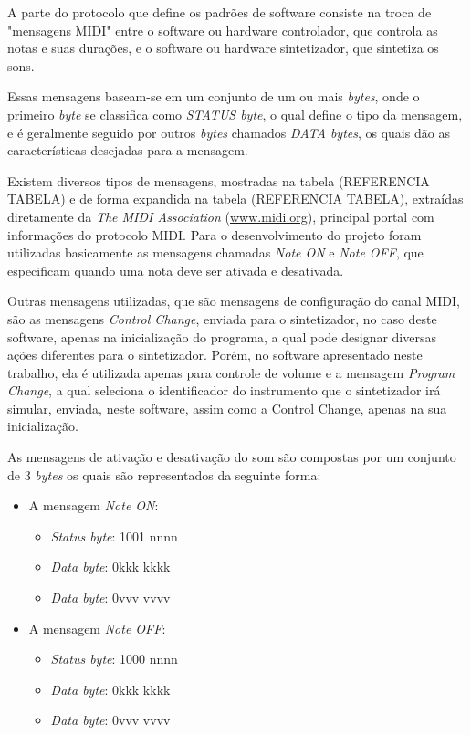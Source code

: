 \documentclass[12pt]{report}
\begin{document}
A parte do protocolo que define os padrões de software consiste na
troca de "mensagens MIDI" entre o software ou hardware controlador,
que controla as notas e suas durações, e o software ou hardware
sintetizador, que sintetiza os sons.

Essas mensagens baseam-se em um conjunto de um ou mais {\it bytes},
onde o primeiro {\it byte} se classifica como {\it STATUS byte}, o
qual define o tipo da mensagem, e é geralmente seguido por outros {\it
  bytes} chamados {\it DATA bytes}, os quais dão as características
desejadas para a mensagem.

Existem diversos tipos de mensagens, mostradas na tabela (REFERENCIA
TABELA) e de forma expandida na tabela (REFERENCIA TABELA), extraídas
diretamente da {\it The MIDI Association} (\url{www.midi.org}),
principal portal com informações do protocolo MIDI. Para o
desenvolvimento do projeto foram utilizadas basicamente as mensagens
chamadas {\it Note ON} e {\it Note OFF}, que especificam quando uma
nota deve ser ativada e desativada.

Outras mensagens utilizadas, que são mensagens de
configuração do canal MIDI, são as mensagens {\it Control Change},
enviada para o sintetizador, no caso deste software, apenas na
inicialização do programa, a qual pode designar diversas ações
diferentes para o sintetizador. Porém, no software apresentado neste
trabalho, ela é utilizada apenas para controle de volume e a mensagem
{\it Program Change}, a qual seleciona o identificador do instrumento
que o sintetizador irá simular, enviada, neste software, assim como a
Control Change, apenas na sua inicialização.

As mensagens de ativação e desativação do som são compostas por um
conjunto de 3 {\it bytes} os quais são representados da seguinte
forma:
\begin{itemize}
  \item A mensagem {\it Note ON}:
  \begin{itemize}
    \item {\it Status byte}: 1001 nnnn
    \item {\it Data byte}: 0kkk kkkk
    \item {\it Data byte}: 0vvv vvvv
  \end{itemize}
  \item A mensagem {\it Note OFF}:
  \begin{itemize}
    \item {\it Status byte}: 1000 nnnn
    \item {\it Data byte}: 0kkk kkkk
    \item {\it Data byte}: 0vvv vvvv
  \end{itemize}
\end{itemize}
\end{document}

